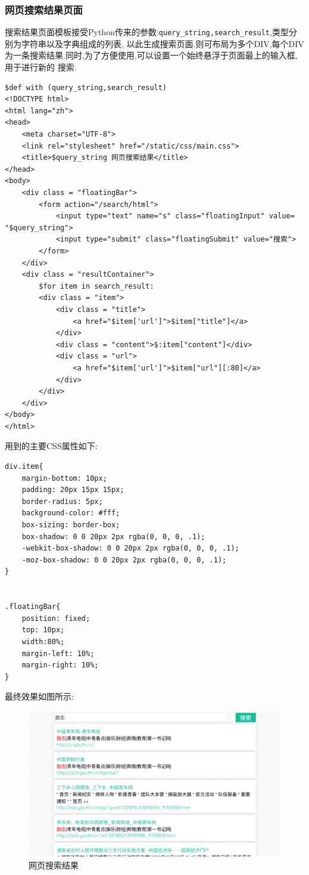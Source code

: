 \documentclass[a4paper]{article}
\begin{document}
            \subsubsection{网页搜索结果页面}
搜索结果页面模板接受Python传来的参数:\texttt{query_string,search_result},类型分别为字符串以及字典组成的列表,
以此生成搜索页面.则可布局为多个DIV,每个DIV为一条搜索结果.同时,为了方便使用,可以设置一个始终悬浮于页面最上的输入框,用于进行新的
搜索.
\begin{verbatim}
$def with (query_string,search_result)
<!DOCTYPE html>
<html lang="zh">
<head>
    <meta charset="UTF-8">
    <link rel="stylesheet" href="/static/css/main.css">
    <title>$query_string 网页搜索结果</title>
</head>
<body>
    <div class = "floatingBar">
        <form action="/search/html">
            <input type="text" name="s" class="floatingInput" value= "$query_string">
            <input type="submit" class="floatingSubmit" value="搜索">
        </form>
    </div>
    <div class = "resultContainer">
        $for item in search_result:
        <div class = "item">
            <div class = "title">
                <a href="$item['url']">$item["title"]</a>
            </div>
            <div class = "content">$:item["content"]</div>
            <div class = "url">
                <a href="$item['url']">$item["url"][:80]</a>
            </div>
        </div>
    </div>
</body>
</html>
\end{verbatim}

用到的主要CSS属性如下:
\begin{verbatim}
div.item{
    margin-bottom: 10px;
    padding: 20px 15px 15px;
    border-radius: 5px;
    background-color: #fff;
    box-sizing: border-box;
    box-shadow: 0 0 20px 2px rgba(0, 0, 0, .1);
    -webkit-box-shadow: 0 0 20px 2px rgba(0, 0, 0, .1);
    -moz-box-shadow: 0 0 20px 2px rgba(0, 0, 0, .1);
}


.floatingBar{
    position: fixed;
    top: 10px;
    width:80%;
    margin-left: 10%;
    margin-right: 10%;
}
\end{verbatim}

最终效果如图所示:
\begin{figure}[H]
\centering
\includegraphics[width=\textwidth]{img/result.png}
\caption{网页搜索结果}
\end{figure}
\end{document}
